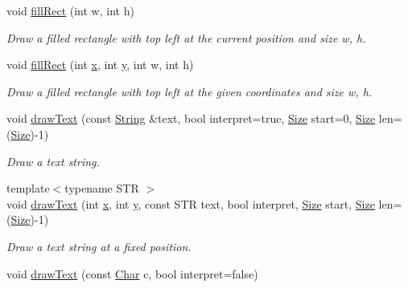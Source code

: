 \begin{DoxyCompactItemize}
void \hyperlink{classGUI_1_1Drawable_af28c6abd372251f47f1c2748c2aea340}{fill\-Rect} (int w, int h)
\begin{DoxyCompactList}\small\item\em Draw a filled rectangle with top left at the current position and size {\ttfamily w}, {\ttfamily h}. \end{DoxyCompactList}\item 
void \hyperlink{classGUI_1_1Drawable_af31dc67b9230aa12a0988905643238c8}{fill\-Rect} (int \hyperlink{classGUI_1_1Drawable_a098294925bd310aa41080a2441790b80}{x}, int \hyperlink{classGUI_1_1Drawable_a574c99954cc268937f2c66ebe1332316}{y}, int w, int h)
\begin{DoxyCompactList}\small\item\em Draw a filled rectangle with top left at the given coordinates and size {\ttfamily w}, {\ttfamily h}. \end{DoxyCompactList}\item 
void \hyperlink{classGUI_1_1Drawable_ac88bcd93aad76b004ea2404fa0a37a69}{draw\-Text} (const \hyperlink{classGUI_1_1String}{String} \&text, bool interpret=true, \hyperlink{namespaceGUI_a10b6232e08729baa0bd211a86a69ce36}{Size} start=0, \hyperlink{namespaceGUI_a10b6232e08729baa0bd211a86a69ce36}{Size} len=(\hyperlink{namespaceGUI_a10b6232e08729baa0bd211a86a69ce36}{Size})-\/1)
\begin{DoxyCompactList}\small\item\em Draw a text string. \end{DoxyCompactList}\item 
{\footnotesize template$<$typename S\-T\-R $>$ }\\void \hyperlink{classGUI_1_1Drawable_ad4f33291af02b41b9e6accda249f935c}{draw\-Text} (int \hyperlink{classGUI_1_1Drawable_a098294925bd310aa41080a2441790b80}{x}, int \hyperlink{classGUI_1_1Drawable_a574c99954cc268937f2c66ebe1332316}{y}, const S\-T\-R text, bool interpret, \hyperlink{namespaceGUI_a10b6232e08729baa0bd211a86a69ce36}{Size} start, \hyperlink{namespaceGUI_a10b6232e08729baa0bd211a86a69ce36}{Size} len=(\hyperlink{namespaceGUI_a10b6232e08729baa0bd211a86a69ce36}{Size})-\/1)
\begin{DoxyCompactList}\small\item\em Draw a text string at a fixed position. \end{DoxyCompactList}\item 
void \hyperlink{classGUI_1_1Drawable_a7d0a7e8d1563edc7abcb8d89e8518b6f}{draw\-Text} (const \hyperlink{namespaceGUI_af6b04b46d40197b4f00e553d7d1a3e4c}{Char} c, bool interpret=false)

\end{DoxyCompactItemize}

